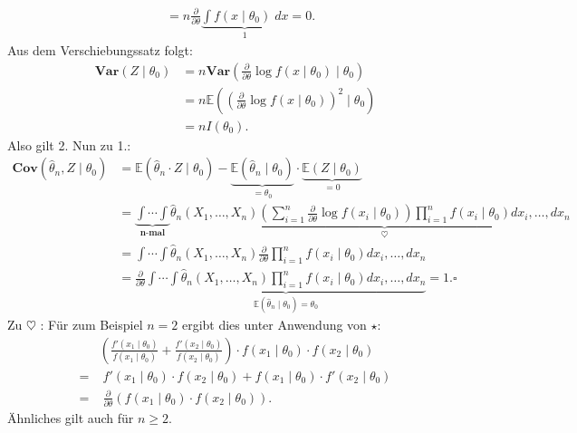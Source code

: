 \documentclass[10pt]{article}
\newcommand{\FZV}{X_1, \ldots, X_n} %
\newcommand{\EW}{\mathbb{E}} %
\newcommand{\ablt}{\frac{\partial}{\partial \theta}}
\newenvironment{BWS}[1][]
{\begin{Beweis}[frametitle=#1]}{\end{Beweis}}
\begin{document}
\begin{BWS}[Beweis 1.4.1 (Cramér-Rao-Schranke)]
\begin{equation*}
\begin{split}
				&= n \ablt \underbrace{\int f(x \mid \theta_0) \; dx}_{1} = 0.
			\end{split}
		\end{equation*}
		Aus dem Verschiebungssatz folgt:
		\begin{equation*}
			\begin{split}
				\textbf{Var}(Z \mid \theta_0) &= n \textbf{Var}\left(\ablt \log f(x \mid \theta_0)\mid \theta_0 \right)\\
				&= n\EW\left(\left(\ablt \log f(x \mid \theta_0)\right)^2 \mid \theta_0\right)\\
				&= nI(\theta_0).
			\end{split}
		\end{equation*}
		Also gilt 2. Nun zu 1.:
		\begin{equation*}
			\begin{split}
				\textbf{Cov}(\hat{\theta}_n, Z \mid \theta_0) &= \EW(\hat{\theta}_n \cdot Z \mid \theta_0) - \underbrace{\EW(\hat{\theta}_n \mid \theta_0)}_{= \theta_0} \cdot \underbrace{\EW(Z \mid \theta_0)}_{= 0}\\
				&= \underbrace{\int \cdots \int}_{\textbf{n-mal}}\hat{\theta}_n(\FZV) \underbrace{(\sum_{i=1}^{n}\ablt \log f(x_i \mid \theta_0)) \prod_{i=1}^{n}f(x_i \mid \theta_0)}_{\heartsuit} dx_i, \ldots, dx_n\\
				&= \int \cdots \int \hat{\theta}_n (\FZV) \ablt \prod_{i=1}^{n} f(x_i \mid \theta_0) dx_i, \ldots, dx_n\\
				&= \ablt \underbrace{\int \cdots \int \hat{\theta}_n(\FZV) \prod_{i=1}^{n} f(x_i \mid \theta_0) dx_i, \ldots, dx_n}_{\EW(\hat{\theta}_n \mid \theta_0) = \theta_0} = 1. \square
			\end{split}
		\end{equation*}
		Zu $\heartsuit$ : Für zum Beispiel $n=2$ ergibt dies unter Anwendung von $\star$:
		\begin{equation*}
			\begin{split}
				&\left(\frac{f'(x_1 \mid \theta_0)}{f(x_1 \mid \theta_0)} + \frac{f'(x_2 \mid \theta_0)}{f(x_2 \mid \theta_0)}\right) \cdot f(x_1 \mid \theta_0) \cdot f(x_2 \mid \theta_0)\\
				= & \;f'(x_1 \mid \theta_0) \cdot f(x_2 \mid \theta_0) + f(x_1 \mid \theta_0) \cdot f'(x_2 \mid \theta_0)\\
				= & \;\ablt (f(x_1 \mid \theta_0) \cdot f(x_2 \mid \theta_0)).
			\end{split}
		\end{equation*}
		Ähnliches gilt auch für $n \geq 2$.
	\end{BWS}
	
\end{document}
